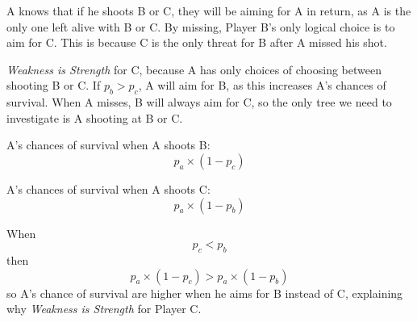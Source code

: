 \documentclass[a4paper, 11pt]{article}
\begin{document}
A knows that if he shoots B or C, they will be aiming for A in return, as A is the only one left alive with B or C. By missing, Player B's only logical choice is to aim for C. This is because C is the only threat for B after A missed his shot.

\textit{Weakness is Strength} for C, because A has only choices of choosing between shooting B or C. If $p_b > p_c$, A will aim for B, as this increases A's chances of survival. When A misses, B will always aim for C, so the only tree we need to investigate is A shooting at B or C.

A's chances of survival when A shoots B: 
\[ p_a \times (1-p_c) \]

A's chances of survival when A shoots C: 
\[ p_a \times (1-p_b) \]

When 
\[p_c < p_b\] 
then 
\[ p_a \times (1-p_c) > p_a \times (1-p_b) \]
so A's chance of survival are higher when he aims for B instead of C, explaining why \textit{Weakness is Strength} for Player C.

\newpage



\end{document}
